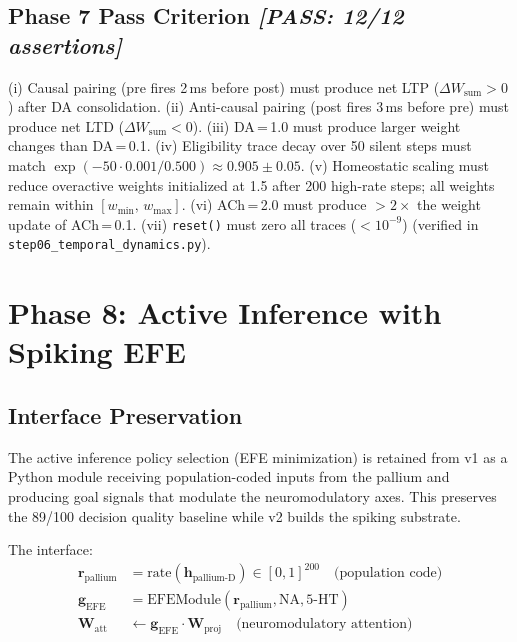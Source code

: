 \documentclass[11pt,a4paper]{article}
\begin{document}
\subsection{Phase 7 Pass Criterion \textit{[PASS: 12/12 assertions]}}

(i) Causal pairing (pre fires 2\,ms before post) must produce net LTP
($\Delta W_\text{sum} > 0$) after DA consolidation.
(ii) Anti-causal pairing (post fires 3\,ms before pre) must produce net LTD
($\Delta W_\text{sum} < 0$).
(iii) DA\,=\,1.0 must produce larger weight changes than DA\,=\,0.1.
(iv) Eligibility trace decay over 50 silent steps must match
$\exp(-50 \cdot 0.001 / 0.500) \approx 0.905 \pm 0.05$.
(v) Homeostatic scaling must reduce overactive weights initialized at 1.5
after 200 high-rate steps; all weights remain within $[w_\min,\, w_\max]$.
(vi) ACh\,=\,2.0 must produce $>2\times$ the weight update of ACh\,=\,0.1.
(vii) \texttt{reset()} must zero all traces ($< 10^{-9}$)
(verified in \texttt{step06\_temporal\_dynamics.py}).

\section{Phase 8: Active Inference with Spiking EFE}\label{sec:phase8}

\subsection{Interface Preservation}

The active inference policy selection (EFE minimization) is retained
from v1 as a Python module receiving population-coded inputs from the
pallium and producing goal signals that modulate the neuromodulatory axes.
This preserves the 89/100 decision quality baseline while v2 builds
the spiking substrate.

The interface:
\begin{equation}\label{eq:ai_interface}
\begin{aligned}
  \mathbf{r}_\text{pallium} &= \text{rate}(\mathbf{h}_\text{pallium-D}) \in [0,1]^{200}
    \quad\text{(population code)} \\
  \mathbf{g}_\text{EFE} &= \text{EFEModule}(\mathbf{r}_\text{pallium}, \text{NA}, \text{5-HT}) \\
  \mathbf{W}_\text{att} &\leftarrow \mathbf{g}_\text{EFE} \cdot \mathbf{W}_\text{proj}
    \quad\text{(neuromodulatory attention)} \\
\end{aligned}
\end{equation}
\end{document}
